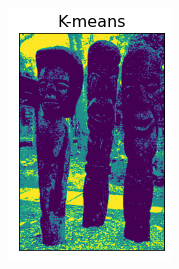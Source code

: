 \documentclass[12pt]{extarticle}
\begin{document}
\begin{figure}[!h]
\begin{subfigure}[b]{0.19\textwidth}
        \includegraphics[width=\textwidth]{kmeans_compared.png}
        \caption{}
        \label{fig:f3}
      \end{subfigure}
      \hfill
      \begin{subfigure}[b]{0.19\textwidth}

\end{subfigure}
\end{figure}
\end{document}
